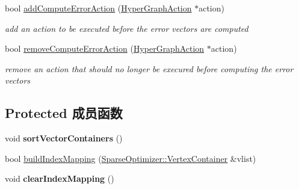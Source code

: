 \begin{DoxyCompactItemize}
\item 
\hypertarget{classg2o_1_1SparseOptimizer_a43517d9f9f23ba6041061c57dddd916d}{bool \hyperlink{classg2o_1_1SparseOptimizer_a43517d9f9f23ba6041061c57dddd916d}{add\-Compute\-Error\-Action} (\hyperlink{classg2o_1_1HyperGraphAction}{Hyper\-Graph\-Action} $\ast$action)}\label{classg2o_1_1SparseOptimizer_a43517d9f9f23ba6041061c57dddd916d}

\begin{DoxyCompactList}\small\item\em add an action to be executed before the error vectors are computed \end{DoxyCompactList}\item 
\hypertarget{classg2o_1_1SparseOptimizer_aaeb1bffea0c80d98b6650cbf51be2b80}{bool \hyperlink{classg2o_1_1SparseOptimizer_aaeb1bffea0c80d98b6650cbf51be2b80}{remove\-Compute\-Error\-Action} (\hyperlink{classg2o_1_1HyperGraphAction}{Hyper\-Graph\-Action} $\ast$action)}\label{classg2o_1_1SparseOptimizer_aaeb1bffea0c80d98b6650cbf51be2b80}

\begin{DoxyCompactList}\small\item\em remove an action that should no longer be execured before computing the error vectors \end{DoxyCompactList}\end{DoxyCompactItemize}
\subsection*{Protected 成员函数}
\begin{DoxyCompactItemize}
\item 
\hypertarget{classg2o_1_1SparseOptimizer_a8a8c6f08bc9b8a4e520aa73198268991}{void {\bfseries sort\-Vector\-Containers} ()}\label{classg2o_1_1SparseOptimizer_a8a8c6f08bc9b8a4e520aa73198268991}

\item 
bool \hyperlink{classg2o_1_1SparseOptimizer_a8c6af9785e85153ade1490beacad73ce}{build\-Index\-Mapping} (\hyperlink{structg2o_1_1OptimizableGraph_a54f01b9b6071e65e6abeebe4afb29dec}{Sparse\-Optimizer\-::\-Vertex\-Container} \&vlist)
\item 
\hypertarget{classg2o_1_1SparseOptimizer_ab6f1f4ad2b1fd50b8019c6abb89ac6a8}{void {\bfseries clear\-Index\-Mapping} ()}\label{classg2o_1_1SparseOptimizer_ab6f1f4ad2b1fd50b8019c6abb89ac6a8}

\end{DoxyCompactItemize}
